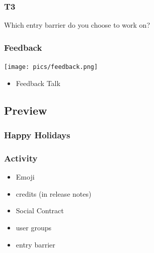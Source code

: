 \begin{frame}
	\frametitle{T3}

	\begin{task}
	Which entry barrier do you choose to work on?
	\end{task}
\end{frame}

\begin{frame}
	\frametitle{Feedback}

	\hfill \texttt{[image: pics/feedback.png]}
	\vspace{-1cm}
	\begin{itemize}
		\item Feedback Talk
	\end{itemize}
\end{frame}

\subsection{Preview}

\begin{frame}
	\frametitle{Happy Holidays}
\end{frame}

\begin{assignment}
	\frametitle{Activity}

	\pause

	\begin{itemize}[<+-| alert@+>]
		\item Emoji
		\item credits (in release notes)
		\item Social Contract
		\item user groups
		\item entry barrier
	\end{itemize}
\end{assignment}


\appendix

\begin{frame}[allowframebreaks]
	
	
\end{frame}





